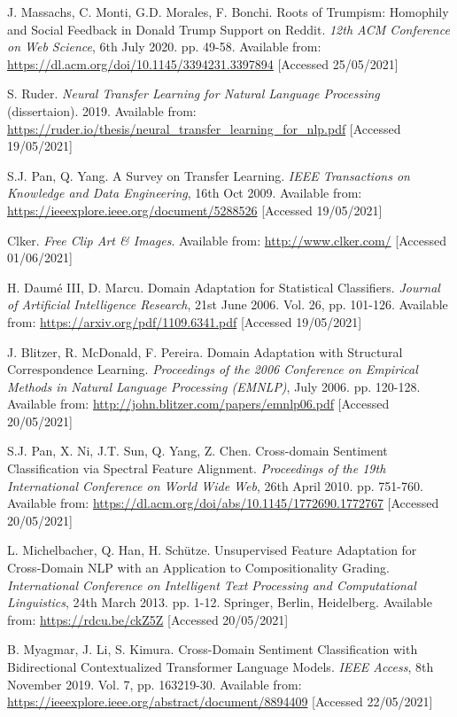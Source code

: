 \begin{thebibliography}{9}
J. Massachs, C. Monti, G.D. Morales, F. Bonchi. Roots of Trumpism: Homophily and Social Feedback in Donald Trump Support on Reddit. \textit{12th ACM Conference on Web Science}, 6th July 2020. pp. 49-58. Available from: \url{https://dl.acm.org/doi/10.1145/3394231.3397894} [Accessed 25/05/2021]

S. Ruder. \textit{Neural Transfer Learning for Natural Language Processing} (dissertaion). 2019. Available from: \url{https://ruder.io/thesis/neural_transfer_learning_for_nlp.pdf} [Accessed 19/05/2021]

S.J. Pan, Q. Yang. A Survey on Transfer Learning. \textit{IEEE Transactions on Knowledge and Data Engineering}, 16th Oct 2009. Available from: \url{https://ieeexplore.ieee.org/document/5288526} [Accessed 19/05/2021]

Clker. \textit{Free Clip Art \& Images}. Available from: \url{http://www.clker.com/} [Accessed 01/06/2021]

H. Daumé III, D. Marcu. Domain Adaptation for Statistical Classifiers. \textit{Journal of Artificial Intelligence Research}, 21st June 2006. Vol. 26, pp. 101-126. Available from: \url{https://arxiv.org/pdf/1109.6341.pdf} [Accessed 19/05/2021]

J. Blitzer, R. McDonald, F. Pereira. Domain Adaptation with Structural Correspondence Learning. \textit{Proceedings of the 2006 Conference on Empirical Methods in Natural Language Processing (EMNLP)}, July 2006. pp. 120-128. Available from: \url{http://john.blitzer.com/papers/emnlp06.pdf} [Accessed 20/05/2021]

S.J. Pan, X. Ni, J.T. Sun, Q. Yang, Z. Chen. Cross-domain Sentiment Classification via Spectral Feature Alignment. \textit{Proceedings of the 19th International Conference on World Wide Web}, 26th April 2010. pp. 751-760. Available from: \url{https://dl.acm.org/doi/abs/10.1145/1772690.1772767} [Accessed 20/05/2021]

L. Michelbacher, Q. Han, H. Schütze. Unsupervised Feature Adaptation for Cross-Domain NLP with an Application to Compositionality Grading. \textit{International Conference on Intelligent Text Processing and Computational Linguistics}, 24th March 2013. pp. 1-12. Springer, Berlin, Heidelberg. Available from: \url{https://rdcu.be/ckZ5Z} [Accessed 20/05/2021]

B. Myagmar, J. Li, S. Kimura. Cross-Domain Sentiment Classification with Bidirectional Contextualized Transformer Language Models. \textit{IEEE Access}, 8th November 2019. Vol. 7, pp. 163219-30. Available from: \url{https://ieeexplore.ieee.org/abstract/document/8894409} [Accessed 22/05/2021]


\end{thebibliography}
